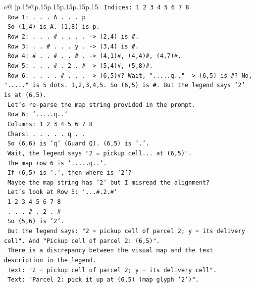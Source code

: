 \documentclass{article}
\begin{document}
{\begin{supertabular}{c@{$\;$}|p{.15\linewidth}@{}p{.15\linewidth}p{.15\linewidth}p{.15\linewidth}p{.15\linewidth}p{.15\linewidth}}
{{{\texttt{       Indices: 1 2 3 4 5 6 7 8} \\
\texttt{       Row 1: . . . A . . . p} \\
\texttt{       So (1,4) is A. (1,8) is p.} \\
\texttt{       Row 2: . . . \# . . . . {-}> (2,4) is \#.} \\
\texttt{       Row 3: . . \# . . . y . {-}> (3,4) is \#.} \\
\texttt{       Row 4: \# . . \# . . \# . {-}> (4,1)\#, (4,4)\#, (4,7)\#.} \\
\texttt{       Row 5: . . . \# . 2 . \# {-}> (5,4)\#, (5,8)\#.} \\
\texttt{       Row 6: . . . . \# . . . {-}> (6,5)\#? Wait, ".....q.." {-}> (6,5) is \#? No, "....." is 5 dots. 1,2,3,4,5. So (6,5) is \#. But the legend says '2' is at (6,5).} \\
\texttt{       Let's re{-}parse the map string provided in the prompt.} \\
\texttt{       Row 6: `.....q..`} \\
\texttt{       Columns: 1 2 3 4 5 6 7 8} \\
\texttt{       Chars: . . . . . q . .} \\
\texttt{       So (6,6) is 'q' (Guard Q). (6,5) is '.'.} \\
\texttt{       Wait, the legend says "2 = pickup cell... at (6,5)".} \\
\texttt{       The map row 6 is `.....q..`.} \\
\texttt{       If (6,5) is '.', then where is '2'?} \\
\texttt{       Maybe the map string has '2' but I misread the alignment?} \\
\texttt{       Let's look at Row 5: `...\#.2.\#`} \\
\texttt{       1 2 3 4 5 6 7 8} \\
\texttt{       . . . \# . 2 . \#} \\
\texttt{       So (5,6) is '2'.} \\
\texttt{       But the legend says: "2 = pickup cell of parcel 2; y = its delivery cell". And "Pickup cell of parcel 2: (6,5)".} \\
\texttt{       There is a discrepancy between the visual map and the text description in the legend.} \\
\texttt{       Text: "2 = pickup cell of parcel 2; y = its delivery cell".} \\
\texttt{       Text: "Parcel 2: pick it up at (6,5) (map glyph '2')".} \\
}}}
\end{supertabular}}
\end{document}
